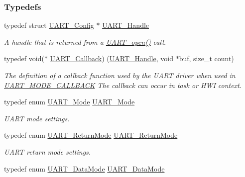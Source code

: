 \subsubsection*{Typedefs}
\begin{DoxyCompactItemize}
\item 
typedef struct \hyperlink{struct_u_a_r_t___config}{U\+A\+R\+T\+\_\+\+Config} $\ast$ \hyperlink{_u_a_r_t_8h_a13cc669fae768d8212e6491ce71b28af}{U\+A\+R\+T\+\_\+\+Handle}
\begin{DoxyCompactList}\small\item\em A handle that is returned from a \hyperlink{_u_a_r_t_8h_a0442ea1ec23901168da31726bb3254c1}{U\+A\+R\+T\+\_\+open()} call. \end{DoxyCompactList}\item 
typedef void($\ast$ \hyperlink{_u_a_r_t_8h_a44620a9d91e0357ebc6f0a79984d9e1e}{U\+A\+R\+T\+\_\+\+Callback}) (\hyperlink{_u_a_r_t_8h_a13cc669fae768d8212e6491ce71b28af}{U\+A\+R\+T\+\_\+\+Handle}, void $\ast$buf, size\+\_\+t count)
\begin{DoxyCompactList}\small\item\em The definition of a callback function used by the U\+A\+R\+T driver when used in \hyperlink{_u_a_r_t_8h_a2507a620dba95cd20885c52494d19e90ae0dbd9b5195e56c3c2aed10163523754}{U\+A\+R\+T\+\_\+\+M\+O\+D\+E\+\_\+\+C\+A\+L\+L\+B\+A\+C\+K} The callback can occur in task or H\+W\+I context. \end{DoxyCompactList}\item 
typedef enum \hyperlink{_u_a_r_t_8h_a2507a620dba95cd20885c52494d19e90}{U\+A\+R\+T\+\_\+\+Mode} \hyperlink{_u_a_r_t_8h_a247ea9ec7b19a8e46dab1ac86b3eb0a7}{U\+A\+R\+T\+\_\+\+Mode}
\begin{DoxyCompactList}\small\item\em U\+A\+R\+T mode settings. \end{DoxyCompactList}\item 
typedef enum \hyperlink{_u_a_r_t_8h_acb5a82843435a1b5d51b6c27028d914f}{U\+A\+R\+T\+\_\+\+Return\+Mode} \hyperlink{_u_a_r_t_8h_a5fe0b5a28881f05c198e4226536cf62b}{U\+A\+R\+T\+\_\+\+Return\+Mode}
\begin{DoxyCompactList}\small\item\em U\+A\+R\+T return mode settings. \end{DoxyCompactList}\item 
typedef enum \hyperlink{_u_a_r_t_8h_a694090fdb166f94ac30b809f9cba87b8}{U\+A\+R\+T\+\_\+\+Data\+Mode} \hyperlink{_u_a_r_t_8h_a5d5d37ac84acc0ea543ef3737460d41a}{U\+A\+R\+T\+\_\+\+Data\+Mode}

\end{DoxyCompactItemize}

